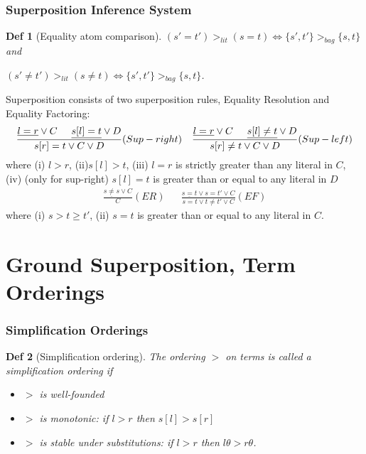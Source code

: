 \documentclass[]{article}
\newtheorem*{definition*}{Def}
\begin{document}
\subsubsection{Superposition Inference System}

\begin{definition*}[Equality atom comparison]	
	$(s' = t') >_{lit} (s=t) \iff \{s',t'\}>_{bag}\{s,t\}$ and
	
	$(s' \not= t') >_{lit} (s\not=t) \iff \{s',t'\}>_{bag}\{s,t\}$.
	
\end{definition*}


Superposition consists of two superposition rules, Equality Resolution and Equality Factoring:
\begin{align*}
	\frac{\underline{l=r} \lor C \hspace{.5cm} \underline{s[l]=t} \lor D}{s[r]=t \lor C \lor D} (Sup-right) && \frac{\underline{l=r} \lor C \hspace{.5cm} \underline{s[l]\not=t} \lor D}{s[r]\not=t \lor C \lor D} (Sup-left)\\
\end{align*}
where (i) $l>r$, (ii)$s[l]>t$, (iii) $l=r$ is strictly greater than any literal in $C$, (iv) (only for sup-right) $s[l]=t$ is greater than or equal to any literal in $D$
\begin{align*}
	\frac{\underline{s\not= s} \lor C}{C} (ER) && \frac{\underline{s=t} \lor s=t' \lor C}{s=t \lor t\not= t' \lor C} (EF)
\end{align*}
where (i) $s>t\geq t'$, (ii) $s=t$ is greater than or equal to any literal in $C$.

\section{Ground Superposition, Term Orderings}

\subsubsection{Simplification Orderings}

\begin{definition*}[Simplification ordering]
	The ordering $>$ on terms is called a simplification ordering if
	\begin{itemize}
		\item $>$ is well-founded
		\item $>$ is monotonic: if $l>r$ then $s[l]>s[r]$
		\item $>$ is stable under substitutions: if $l>r$ then $l\theta > r\theta$.
	\end{itemize}
\end{definition*}
\end{document}

